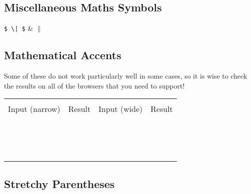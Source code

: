 \subsection*{Miscellaneous Maths Symbols}

\begin{demotable}
\mdemo{\aleph}
\mdemo{\imath}
\mdemo{\jmath}
\mdemo{\ell}
\mdemo{\wp}
\mdemo{\Re}
\mdemo{\Im}
\mdemo{\mho}
\mdemo{\prime}
\mdemo{\emptyset}
\mdemo{\nabla}
\mdemo{\surd}
\mdemo{\top}
\mdemo{\bot}
\mdemo{\angle}
\mdemo{\forall}
\mdemo{\exists}
\mdemo{\neg}
\mdemo{\lnot}
\mdemo{\flat}
\mdemo{\natural}
\mdemo{\sharp}
\mdemo{\backslash}
\mdemo{\partial}
\mdemo{\infty}
\mdemo{\triangle}
\mdemo{\clubsuit}
\mdemo{\diamondsuit}
\mdemo{\heartsuit}
\mdemo{\spadesuit}
\mdemo{\hbar}
\mdemo{\aa}
\mdemo{\AA}
\verb_$ \| $_ & $\|$ \\
\end{demotable}

\subsection*{Mathematical Accents}

Some of these do not work particularly well in some cases, so it is wise to check the
results on all of the browsers that you need to support!

\newcommand{\mademo}[1]{\minout{#1{x}} & \minout{#1{x-y}} \\ }
\newenvironment{mademotable}
{\begin{center}
 \begin{tabular}{|r|l|r|l|}
 \hline \\
 Input (narrow) & Result & Input (wide) & Result \\
 \hline \\
}{\hline
 \end{tabular}
 \end{center}
}

\begin{mademotable}
\mademo{\hat}
\mademo{\bar}
\mademo{\vec}
\mademo{\dot}
\mademo{\ddot}
\mademo{\tilde}
\mademo{\widehat}
\mademo{\widetilde}
\mademo{\overline}
\mademo{\overbrace}
\mademo{\underbrace}
\mademo{\overrightarrow}
\mademo{\overleftarrow}
\mademo{\underline}
\end{mademotable}

\subsection*{Stretchy Parentheses}

